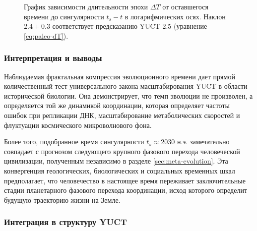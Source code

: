 \documentclass[12pt,a4paper]{article}
\theoremstyle{remark}
\begin{document}
	\begin{figure}[htbp]
		\centering
		\caption{График зависимости длительности эпохи $\Delta T$ от оставшегося времени до сингулярности $t_s - t$ в логарифмических осях. Наклон $2.4 \pm 0.3$ соответствует предсказанию YUCT $2.5$ (уравнение \eqref{eq:paleo-dT}).}
		\label{fig:paleo-scaling}
	\end{figure}
	
	\subsubsection{Интерпретация и выводы}
	
	Наблюдаемая фрактальная компрессия эволюционного времени дает прямой количественный тест универсального закона масштабирования YUCT в области исторической биологии. Она демонстрирует, что темп эволюции не произволен, а определяется той же динамикой координации, которая определяет частоты ошибок при репликации ДНК, масштабирование метаболических скоростей и флуктуации космического микроволнового фона.
	
	Более того, подобранное время сингулярности $t_s \approx 2030$ н.э. замечательно совпадает с прогнозом следующего крупного фазового перехода человеческой цивилизации, полученным независимо в разделе \ref{sec:meta-evolution}. Эта конвергенция геологических, биологических и социальных временных шкал предполагает, что человечество в настоящее время переживает заключительные стадии планетарного фазового перехода координации, исход которого определит будущую траекторию жизни на Земле.
	
	\subsubsection{Интеграция в структуру YUCT}
	
\end{document}
